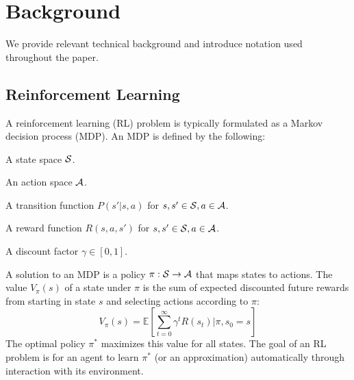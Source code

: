 \section{Background}
We provide relevant technical background and introduce notation
used throughout the paper.

\subsection{Reinforcement Learning}
A reinforcement learning (RL) problem is typically formulated as
a Markov decision process (MDP). An MDP is defined by the following:

\begin{tightlist}
\item A state space $\mathcal{S}$.
\item An action space $\mathcal{A}$.
\item A transition function $P(s' | s, a)$ for $s, s' \in \mathcal{S}, a \in \mathcal{A}$.
\item A reward function $R(s, a, s')$ for $s, s' \in \mathcal{S}, a \in \mathcal{A}$.
\item A discount factor $\gamma \in [0, 1]$.
\end{tightlist}
A solution to an MDP is a policy $\pi: \mathcal{S} \rightarrow \mathcal{A}$ that maps states to
actions. The value $V_{\pi}(s)$ of a state under $\pi$ is the sum of expected
discounted future rewards from starting in state $s$ and selecting actions according
to $\pi$:
$$V_{\pi}(s) = \mathbb{E}[\sum_{t=0}^{\infty}\gamma^{t}R(s_{t}) | \pi, s_{0} = s]$$
The optimal policy $\pi^{*}$ maximizes this value for all states. The goal of an RL
problem is for an agent to learn $\pi^{*}$ (or an approximation) automatically
through interaction with its environment.

